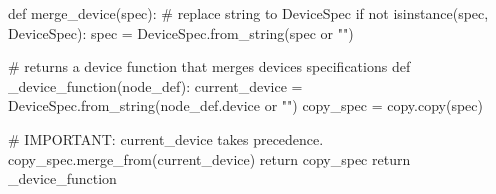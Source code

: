 \begin{content}
\begin{leftbar}
\begin{python}
def merge_device(spec):
  # replace string to DeviceSpec
  if not isinstance(spec, DeviceSpec):
    spec = DeviceSpec.from_string(spec or "")

  # returns a device function that merges devices specifications
  def _device_function(node_def):
    current_device = DeviceSpec.from_string(node_def.device or "")
    copy_spec = copy.copy(spec)
    
    # IMPORTANT: current\_device takes precedence.
    copy_spec.merge_from(current_device)      
    return copy_spec
  return _device_function
\end{python}
\end{leftbar}

\end{content}